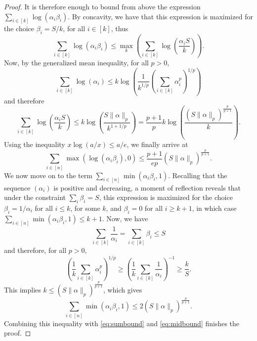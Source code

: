 \documentclass[12pt]{article}
\theoremstyle{definition}
\theoremstyle{remark}
\begin{document}
\begin{proof}
It is therefore enough to bound from above the expression $\sum_{i \in [k]} \log(\alpha_i \beta_i)$. By concavity, we have that this expression is maximized for the choice $\beta_i = S/k$, for all $i \in [k]$, thus
$$
\sum_{i \in [k]} \log(\alpha_i \beta_i) \leq \max_k \left (\sum_{i \in [k]} \log \left ( \frac{\alpha_i S}{k} \right ) \right ).
$$
Now, by the generalized mean inequality, for all $p>0$,
$$
\sum_{i \in [k]} \log(\alpha_i) \leq k \log \left ( \frac{1}{k^{1/p}} \left (\sum_{i \in [k]} \alpha_i^p \right )^{1/p}  \right )
$$
and therefore
$$
\sum_{i \in [k]} \log \left ( \frac{\alpha_i S}{k} \right ) \leq k \log \left ( \frac{S \|\alpha\|_p }{k^{1+1/p}}   \right ) = \frac{p+1}{p} k \log \left ( \frac{ \left (S \|\alpha\|_p\right )^{\frac{p}{p+1}} }{k}   \right ).
$$
Using the inequality $x \log (a/x) \leq a/e$, we finally arrive at
\begin{equation}\label{eq:midbound}
\sum_{i \in [n]} \max(\log(\alpha_i \beta_i), 0) \leq \frac{p+1}{e p} \left (S \|\alpha\|_p\right )^{\frac{p}{p+1}}.
\end{equation}
We now move on to the term $\sum_{i \in [n]} \min(\alpha_i \beta_i, 1)$. Recalling that the sequence $(\alpha_i)$ is positive and decreasing, a moment of reflection reveals that under the constraint $\sum_i \beta_i = S$, this expression is maximized for the choice $\beta_i = 1/\alpha_i$ for all $i \leq k$, for some $k$, and $\beta_i = 0$ for all $i \geq k+1$, in which case $\sum_{i \in [n]} \min(\alpha_i \beta_i, 1) \leq k+1$. Now, we have
$$
\sum_{i \in [k]} \frac{1}{\alpha_i} = \sum_{i \in [k]} \beta_i \leq S
$$
and therefore, for all $p > 0$,
$$
\left (\frac{1}{k} \sum_{i \in [k]} \alpha_i^p \right )^{1/p}  \geq \left ( \frac{1}{k} \sum_{i \in [k]} \frac{1}{\alpha_i}\right )^{-1} \geq \frac{k}{S}.
$$
This implies $k \leq \left ( S \|\alpha\|_p \right )^{\frac{p}{p+1}}$, which gives 
$$
\sum_{i \in [n]} \min(\alpha_i \beta_i, 1) \leq 2 \left ( S \|\alpha\|_p \right )^{\frac{p}{p+1}}.
$$
Combining this inequality with \eqref{eq:sumbound} and \eqref{eq:midbound} finishes the proof.
\end{proof}
\end{document}
